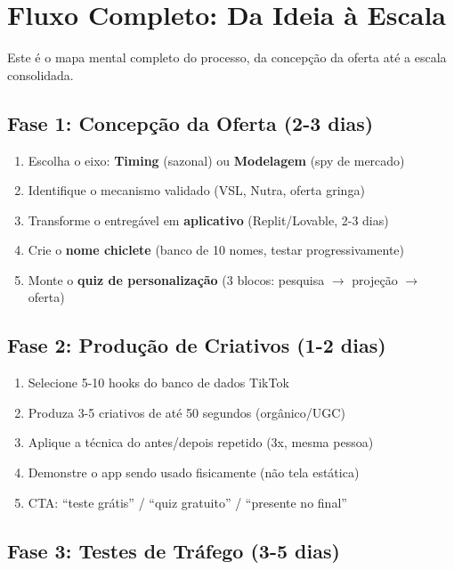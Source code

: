 \documentclass[12pt, a4paper]{article}
\begin{document}
\section{Fluxo Completo: Da Ideia à Escala}

Este é o mapa mental completo do processo, da concepção da oferta até a escala consolidada.

\subsection{Fase 1: Concepção da Oferta (2-3 dias)}

\begin{enumerate}
    \item Escolha o eixo: \textbf{Timing} (sazonal) ou \textbf{Modelagem} (spy de mercado)
    \item Identifique o mecanismo validado (VSL, Nutra, oferta gringa)
    \item Transforme o entregável em \textbf{aplicativo} (Replit/Lovable, 2-3 dias)
    \item Crie o \textbf{nome chiclete} (banco de 10 nomes, testar progressivamente)
    \item Monte o \textbf{quiz de personalização} (3 blocos: pesquisa $\rightarrow$ projeção $\rightarrow$ oferta)
\end{enumerate}

\subsection{Fase 2: Produção de Criativos (1-2 dias)}

\begin{enumerate}
    \item Selecione 5-10 hooks do banco de dados TikTok
    \item Produza 3-5 criativos de até 50 segundos (orgânico/UGC)
    \item Aplique a técnica do antes/depois repetido (3x, mesma pessoa)
    \item Demonstre o app sendo usado fisicamente (não tela estática)
    \item CTA: ``teste grátis'' / ``quiz gratuito'' / ``presente no final''
\end{enumerate}

\subsection{Fase 3: Testes de Tráfego (3-5 dias)}
\end{document}
